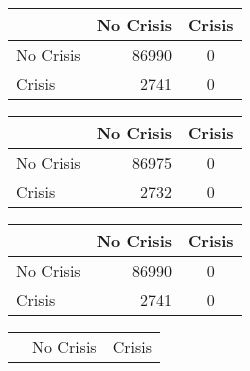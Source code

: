 \begin{table}
    \begin{center}
        \begin{subtable}[c]{0.4\textwidth}
            \begin{tabular}{lrc}
                \hline
                 & No Crisis & Crisis \\
                \hline
                No Crisis & 86990 & 0 \\
                Crisis & 2741 & 0\\
                \hline
            \end{tabular}
            \label{tab:mat-conf-raw-1.8}
        \end{subtable}
        \hspace{1em}\vspace{1em}
        \begin{subtable}[c]{0.4\textwidth}
                \begin{tabular}{lrc}
                \hline
                 & No Crisis & Crisis \\
                \hline
                No Crisis & 86975 & 0 \\
                Crisis & 2732 & 0\\
                \hline
            \end{tabular}
            \label{tab:mat-conf-stats-1.9}
        \end{subtable}
        \begin{subtable}[c]{0.4\textwidth}
            \begin{tabular}{lrc}
                \hline
                 & No Crisis & Crisis \\
                \hline
                No Crisis & 86990 & 0 \\
                Crisis & 2741 & 0\\
                \hline
            \end{tabular}
            \label{tab:mat-conf-raw-1.9}
        \end{subtable}
        \hspace{1em}\vspace{1em}
        \begin{subtable}[c]{0.4\textwidth}
                \begin{tabular}{lrc}
                \hline
                 & No Crisis & Crisis \\

\end{tabular}
\end{subtable}
\end{center}
\end{table}
